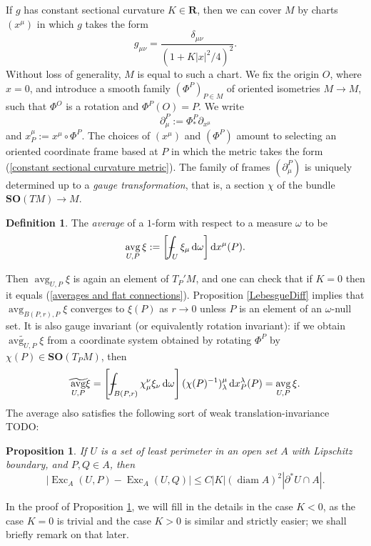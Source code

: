 \documentclass[reqno,10pt]{amsart}
\newcommand{\RR}{\mathbf{R}}
\newcommand{\SpOrth}{\mathbf{SO}}
\DeclareMathOperator{\avg}{avg}
\DeclareMathOperator{\diam}{diam}
\DeclareMathOperator{\Exc}{Exc}
\newcommand*\dif{\mathop{}\!\mathrm{d}}
\newcommand{\dfn}[1]{\emph{#1}\index{#1}}
\newtheorem{proposition}[theorem]{Proposition}
\theoremstyle{definition}
\newtheorem{definition}[theorem]{Definition}
\numberwithin{equation}{section}
\def\Xint#1{\mathchoice
{\XXint\displaystyle\textstyle{#1}}%
{\XXint\textstyle\scriptstyle{#1}}%
{\XXint\scriptstyle\scriptscriptstyle{#1}}%
{\XXint\scriptscriptstyle\scriptscriptstyle{#1}}%
\!\int}
\def\XXint#1#2#3{{\setbox0=\hbox{$#1{#2#3}{\int}$ }
\vcenter{\hbox{$#2#3$ }}\kern-.6\wd0}}
\def\dashint{\Xint-}
\begin{document}
If $g$ has constant sectional curvature $K \in \RR$, then we can cover $M$ by charts $(x^\mu)$ in which $g$ takes the form
\begin{equation}\label{constant sectional curvature metric}
g_{\mu\nu} = \frac{\delta_{\mu\nu}}{(1 + K|x|^2/4)^2}.
\end{equation}
Without loss of generality, $M$ is equal to such a chart.
We fix the origin $O$, where $x = 0$, and introduce a smooth family $(\Phi^P)_{P \in M}$ of oriented isometries $M \to M$, such that $\Phi^O$ is a rotation and $\Phi^P(O) = P$.
We write
$$\partial^P_\mu := \Phi^P_* \partial_{x^\mu}$$
and $x^\mu_P := x^\mu \circ \Phi^P$.
The choices of $(x^\mu)$ and $(\Phi^P)$ amount to selecting an oriented coordinate frame based at $P$ in which the metric takes the form (\ref{constant sectional curvature metric}).
The family of frames $(\partial^P_\mu)$ is uniquely determined up to a \dfn{gauge transformation}, that is, a section $\chi$ of the bundle $\SpOrth(TM) \to M$.

\begin{definition}
The \dfn{average} of a $1$-form with respect to a measure $\omega$ to be
$$\avg_{U, P} \xi := \left[\dashint_U \xi_\mu \dif \omega\right] \dif x^\mu(P).$$
\end{definition}

Then $\avg_{U, P} \xi$ is again an element of $T_P'M$, and one can check that if $K = 0$ then it equals (\ref{averages and flat connections}).
Proposition \ref{LebesgueDiff} implies that $\avg_{B(P, r), P} \xi$ converges to $\xi(P)$ as $r \to 0$ unless $P$ is an element of an $\omega$-null set.
It is also gauge invariant (or equivalently rotation invariant): if we obtain $\widetilde{\avg_{U, P}} \xi$ from a coordinate system obtained by rotating $\Phi^P$ by $\chi(P) \in \SpOrth(T_PM)$, then
$$\widetilde{\avg_{U, P}} \xi = \left[\dashint_{B(P, r)} \chi^\nu_\mu \xi_\nu \dif \omega\right] (\chi(P)^{-1})_\lambda^\mu \dif x^\lambda_P(P) = \avg_{U, P} \xi.$$
The average also satisfies the following sort of weak translation-invariance TODO:

\begin{proposition}\label{translation invariance}
If $U$ is a set of least perimeter in an open set $A$ with Lipschitz boundary, and $P, Q \in A$, then
$$|\Exc_A(U, P) - \Exc_A(U, Q)| \leq C|K|(\diam A)^2 |\partial^* U \cap A|.$$
\end{proposition}

In the proof of Proposition \ref{translation invariance}, we will fill in the details in the case $K < 0$, as the case $K = 0$ is trivial and the case $K > 0$ is similar and strictly easier; we shall briefly remark on that later.
\end{document}
